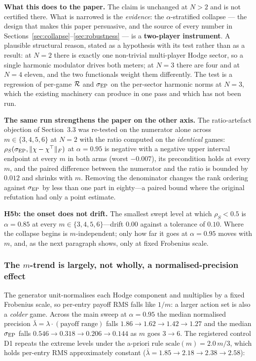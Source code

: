 \noindent\textbf{What this does to the paper.} The claim is unchanged at $N>2$ and is not
certified there. What is narrowed is the \emph{evidence}: the $\alpha$-stratified collapse
--- the design that makes this paper persuasive, and the source of every number in
Sections~\ref{sec:collapse}--\ref{sec:robustness} --- is a \textbf{two-player instrument}.
A plausible structural reason, stated as a hypothesis with its test rather than as a
result: at $N=2$ there is exactly one non-trivial multi-player Hodge sector, so a single
harmonic modulator drives both meters; at $N=3$ there are four and at $N=4$ eleven, and the
two functionals weight them differently. The test is a regression of per-game $\mathcal{R}$ and
$\sigma_{\mathrm{EP}}$ on the per-sector harmonic norms at $N=3$, which the existing machinery can produce
in one pass and which has not been run.

\noindent\textbf{The same run strengthens the paper on the other axis.} The
ratio-artefact objection of Section~3.3 was re-tested on the numerator alone across
$m\in\{3,4,5,6\}$ at $N=2$ with the ratio computed on the \emph{identical} games:
$\rho_S(\sigma_{\mathrm{EP}},\|\chi-\chi^{\top}\|_F)$ at $\alpha=0.95$ is negative with a negative
upper interval endpoint at every $m$ in both arms (worst $-0.007$), its precondition holds
at every $m$, and the paired difference between the numerator and the ratio is bounded by
$0.012$ and shrinks with $m$. Removing the denominator changes the rank ordering against
$\sigma_{\mathrm{EP}}$ by less than one part in eighty---a paired bound where the original refutation had
only a point estimate.

\noindent\textbf{H5b: the onset does not drift.} The smallest swept level at which
$\rho_S<0.5$ is $\alpha=0.85$ at every $m\in\{3,4,5,6\}$---drift $0.00$ against a tolerance
of $0.10$. Where the collapse begins is $m$-independent; only how far it goes at
$\alpha=0.95$ moves with $m$, and, as the next paragraph shows, only at fixed Frobenius
scale.

\subsubsection{The \texorpdfstring{$m$}{m}-trend is largely, not wholly, a normalised-precision effect}
The generator unit-normalises each Hodge component and multiplies by a fixed Frobenius
scale, so per-entry payoff RMS falls like $1/m$: a larger action set is also a
\emph{colder} game. Across the main sweep at $\alpha=0.95$ the median normalised precision
$\bar\lambda=\lambda\cdot(\text{payoff range})$ falls $1.86\to1.62\to1.42\to1.27$ and the
median $\sigma_{\mathrm{EP}}$ falls $0.546\to0.318\to0.206\to0.144$ as $m$ goes $3\to6$. The registered
control D1 repeats the extreme levels under the a-priori rule
$\text{scale}(m)=2.0\,m/3$, which holds per-entry RMS approximately constant
($\bar\lambda=1.85\to2.18\to2.38\to2.58$):

